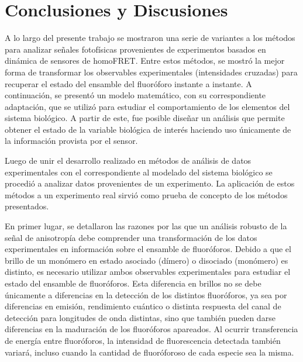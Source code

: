 \chapter{Conclusiones y Discusiones}

A lo largo del presente trabajo se mostraron una serie de variantes a los métodos para analizar señales fotofísicas provenientes de experimentos basados en dinámica de sensores de homoFRET. Entre estos métodos, se mostró la mejor forma de transformar los observables experimentales (intensidades cruzadas) para recuperar el estado del ensamble del fluoróforo instante a instante. A continuación, se presentó un modelo matemático, con su correspondiente adaptación, que se utilizó para estudiar el comportamiento de los elementos del sistema biológico. A partir de este, fue posible diseñar un análisis que permite obtener el estado de la variable biológica de interés haciendo uso únicamente de la información provista por el sensor.

Luego de unir el desarrollo realizado en métodos de análisis de datos experimentales con el correspondiente al modelado del sistema biológico se procedió a analizar datos provenientes de un experimento. La aplicación de estos métodos a un experimento real sirvió como prueba de concepto de los métodos presentados.


En primer lugar, se detallaron las razones por las que un análisis robusto de la señal de anisotropía debe comprender una transformación de los datos experimentales en información sobre el ensamble de fluoróforos. Debido a que el brillo de un monómero en estado asociado (dímero) o disociado (monómero) es distinto, es necesario utilizar ambos observables experimentales para estudiar el estado del ensamble de fluoróforos. Esta diferencia en brillos no se debe únicamente a diferencias en la detección de los distintos fluoróforos, ya sea por diferencias en emisión, rendimiento cuántico o distinta respuesta del canal de detección para longitudes de onda distintas, sino que también pueden darse diferencias en la maduración de los fluoróforos apareados. Al ocurrir transferencia de energía entre fluoróforos, la intensidad de fluorescencia detectada también variará, incluso cuando la cantidad de fluoróforoso de cada especie sea la misma.


